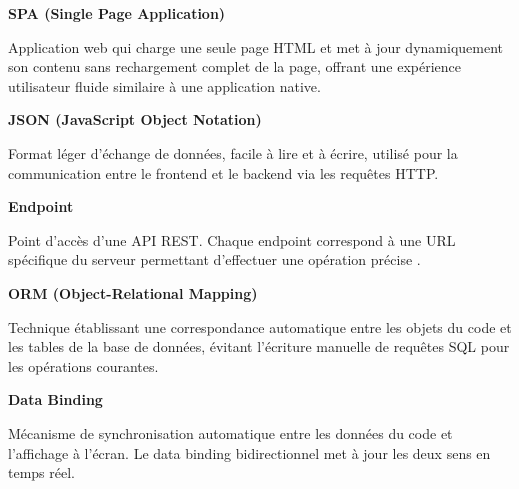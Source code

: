 \documentclass[12pt,a4paper]{report}
\begin{document}



\vspace{0.6cm}

\begin{infobox}
\textbf{SPA (Single Page Application)}

Application web qui charge une seule page HTML et met à jour dynamiquement son contenu sans rechargement complet de la page, offrant une expérience utilisateur fluide similaire à une application native.
\end{infobox}

\vspace{0.6cm}

\begin{infobox}
\textbf{JSON (JavaScript Object Notation)}

Format léger d'échange de données, facile à lire et à écrire, utilisé pour la communication entre le frontend et le backend via les requêtes HTTP.
\end{infobox}

\vspace{0.6cm}

\begin{infobox}
\textbf{Endpoint}

Point d'accès d'une API REST. Chaque endpoint correspond à une URL spécifique du serveur permettant d'effectuer une opération précise .
\end{infobox}

\vspace{0.6cm}

\begin{infobox}
\textbf{ORM (Object-Relational Mapping)}

Technique établissant une correspondance automatique entre les objets du code et les tables de la base de données, évitant l'écriture manuelle de requêtes SQL pour les opérations courantes.
\end{infobox}

\vspace{0.6cm}

\begin{infobox}
\textbf{Data Binding}

Mécanisme de synchronisation automatique entre les données du code et l'affichage à l'écran. Le data binding bidirectionnel met à jour les deux sens en temps réel.
\end{infobox}
\end{document}
